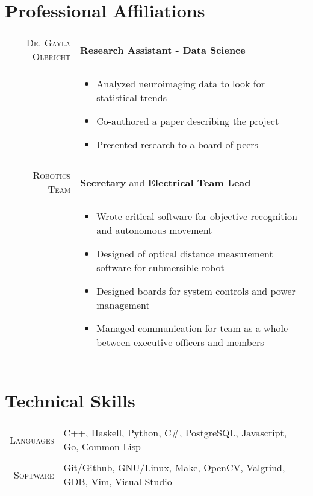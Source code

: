 \documentclass[a4paper,10pt]{article}
\newcommand{\br}{\\\multicolumn{2}{c}{}}
\begin{document}
\section{Professional Affiliations}
\begin{tabular}{r|p{15cm}}
    \textsc{Dr. Gayla Olbricht} & \textbf{Research Assistant - Data Science} \\
     & \begin{itemize}
    \item Analyzed neuroimaging data to look for statistical trends
    \item Co-authored a paper describing the project
    \item Presented research to a board of peers
    \end{itemize} \br\\

    \textsc{Robotics Team} & \textbf{Secretary} and \textbf{Electrical Team Lead} \\
     & \begin{itemize}
     \item Wrote critical software for objective-recognition and autonomous movement
     \item Designed of optical distance measurement software for submersible robot
     \item Designed boards for system controls and power management
     \item Managed communication for team as a whole between executive officers and members
    \end{itemize} \br\\


\end{tabular}

\section{Technical Skills}
\begin{tabular}{r|p{15cm}}
    \textsc{\small Languages} &
    C++,
    Haskell,
    Python,
    C\#,
    PostgreSQL,
    Javascript,
    Go,
    Common Lisp\br\\

    \textsc{\small Software} &
    Git/Github,
    GNU/Linux,
    Make,
    OpenCV,
    Valgrind,
    GDB,
    Vim,
    Visual Studio
\end{tabular}
\end{document}
